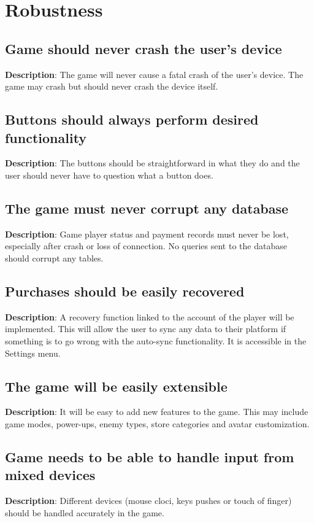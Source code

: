 \section{Robustness}
\renewcommand\thesubsection{ROB-%
\ifnum\value{subsection}<10 0\fi
\arabic{subsection}}
\subsection{Game should never crash the user\textquoteright{}s device}
\textbf{Description}: The game will never cause a fatal crash of the user\textquoteright{}s
device. The game may crash but should never crash the device itself.

\subsection{Buttons should always perform desired functionality}
\textbf{Description}: The buttons should be straightforward in what they do
and the user should never have to question what a button does.

\subsection{The game must never corrupt any database}
\textbf{Description}: Game player status and payment records must never be
lost, especially after crash or loss of connection. No queries sent
to the database should corrupt any tables.

\subsection{Purchases should be easily recovered}
\textbf{Description}: A recovery function linked to the account of the player
will be implemented. This will allow the user to sync any data to
their platform if something is to go wrong with the auto-sync functionality.
It is accessible in the Settings menu.

\subsection{The game will be easily extensible}
\textbf{Description}: It will be easy to add new features to the game. This
may include game modes, power-ups, enemy types, store categories and
avatar customization.

\subsection{Game needs to be able to handle input from mixed devices}
\textbf{Description}: Different devices (mouse cloci, keys pushes or touch 
of finger) should be handled accurately in the game.

